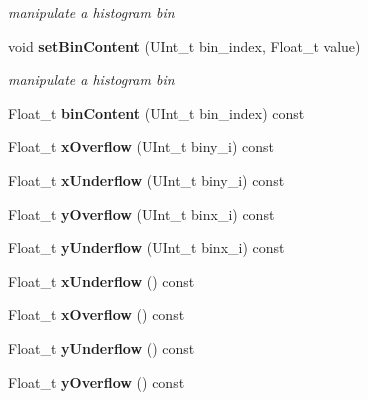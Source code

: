 \begin{DoxyCompactItemize}
\begin{DoxyCompactList}\small\item\em manipulate a histogram bin \end{DoxyCompactList}\item 
void {\bf set\-Bin\-Content} (U\-Int\-\_\-t bin\-\_\-index, Float\-\_\-t value)\label{classhistmgr_1_1FloatHistogram2D_ae32ecb4a2dbe9af82e2d9deae0c27ae9}

\begin{DoxyCompactList}\small\item\em manipulate a histogram bin \end{DoxyCompactList}\item 
Float\-\_\-t {\bfseries bin\-Content} (U\-Int\-\_\-t bin\-\_\-index) const \label{classhistmgr_1_1FloatHistogram2D_a49f9dd18dc961e95f62911da156bbc9e}

\item 
Float\-\_\-t {\bfseries x\-Overflow} (U\-Int\-\_\-t biny\-\_\-i) const \label{classhistmgr_1_1FloatHistogram2D_a84ee60b090e66f1a1839f73543284ad2}

\item 
Float\-\_\-t {\bfseries x\-Underflow} (U\-Int\-\_\-t biny\-\_\-i) const \label{classhistmgr_1_1FloatHistogram2D_abc8e206e2cac237b73663320202bb573}

\item 
Float\-\_\-t {\bfseries y\-Overflow} (U\-Int\-\_\-t binx\-\_\-i) const \label{classhistmgr_1_1FloatHistogram2D_ab3951011e9cf17698a7b3cc5c766446f}

\item 
Float\-\_\-t {\bfseries y\-Underflow} (U\-Int\-\_\-t binx\-\_\-i) const \label{classhistmgr_1_1FloatHistogram2D_aa2267579329064792b162fe320881d42}

\item 
Float\-\_\-t {\bfseries x\-Underflow} () const \label{classhistmgr_1_1FloatHistogram2D_a756024a8658045e2157123e7c4cb3889}

\item 
Float\-\_\-t {\bfseries x\-Overflow} () const \label{classhistmgr_1_1FloatHistogram2D_aa0f77dee0d0554a892ef241ade373e07}

\item 
Float\-\_\-t {\bfseries y\-Underflow} () const \label{classhistmgr_1_1FloatHistogram2D_a9615ca79f363ce43a4283a57b2f93bb9}

\item 
Float\-\_\-t {\bfseries y\-Overflow} () const \label{classhistmgr_1_1FloatHistogram2D_af1610406b9e3914576f3643158237dfa}


\end{DoxyCompactItemize}
